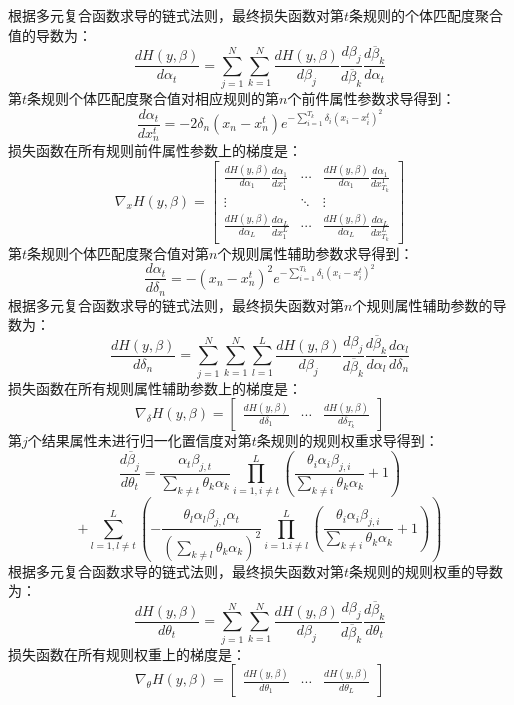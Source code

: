 \documentclass{cjc}
\begin{document}
根据多元复合函数求导的链式法则，最终损失函数对第$t$条规则的个体匹配度聚合值的导数为：
$$\frac{dH(y,\beta)}{d\alpha_t}=\sum_{j=1}^N\sum_{k=1}^N\frac{dH(y,\beta)}{d\beta_j}\frac{d\beta_j}{d\overline{\beta}_k}\frac{d\overline{\beta}_k}{d\alpha_t}$$
第$t$条规则个体匹配度聚合值对相应规则的第$n$个前件属性参数求导得到：
$$\frac{d\alpha_t}{dx_n^t}=-2\delta_n(x_n-x_n^t)e^{-\sum_{i=1}^{T_k}\delta_i(x_i-x_i^t)^2}$$
损失函数在所有规则前件属性参数上的梯度是：
$$\nabla_{x}H(y,\beta)=\left[
\begin{matrix}
\frac{dH(y,\beta)}{d\alpha_1}\frac{d\alpha_1}{dx_1^1} & \cdots &
\frac{dH(y,\beta)}{d\alpha_1}\frac{d\alpha_1}{dx_{T_k}^1}\\
\vdots & \ddots & \vdots \\
\frac{dH(y,\beta)}{d\alpha_L}\frac{d\alpha_L}{dx_1^L}  & \cdots &
\frac{dH(y,\beta)}{d\alpha_L}\frac{d\alpha_L}{dx_{T_k}^L} 
\end{matrix}
\right]$$
第$t$条规则个体匹配度聚合值对第$n$个规则属性辅助参数求导得到：
$$\frac{d\alpha_t}{d\delta_n}=-(x_n-x_n^t)^{2}e^{-\sum_{i=1}^{T_k}\delta_i(x_i-x_i^t)^2}$$
根据多元复合函数求导的链式法则，最终损失函数对第$n$个规则属性辅助参数的导数为：
$$\frac{dH(y,\beta)}{d\delta_n}=\sum_{j=1}^N\sum_{k=1}^N\sum_{l=1}^L\frac{dH(y,\beta)}{d\beta_j}\frac{d\beta_j}{d\overline{\beta}_k}\frac{d\overline{\beta}_k}{d\alpha_l}\frac{d\alpha_l}{d\delta_n}$$
损失函数在所有规则属性辅助参数上的梯度是：
$$
\nabla_{\delta}H(y,\beta)=\left[
\begin{matrix}
\frac{dH(y,\beta)}{d\delta_1} & \cdots &
\frac{dH(y,\beta)}{d\delta_{T_k}}
\end{matrix}
\right]
$$
第$j$个结果属性未进行归一化置信度对第$t$条规则的规则权重求导得到：
$$\frac{d\overline{\beta}_j}{d\theta_t}=\frac{\alpha_t\beta_{j,t}}{\sum_{k\neq t}\theta_k\alpha_k}\prod_{i=1,i\neq t}^L(\frac{\theta_i\alpha_i\beta_{j,i}}{\sum_{k\neq i}{\theta_k\alpha_k}}+1)$$
$$+\sum_{l=1,l\neq t}^L(-\frac{\theta_l\alpha_l\beta_{j,l}\alpha_t}{(\sum_{k\neq l}\theta_k\alpha_k)^2}\prod_{i=1.i\neq l}^L(\frac{\theta_i\alpha_i\beta_{j,i}}{\sum_{k\neq i}{\theta_k\alpha_k}}+1))$$
根据多元复合函数求导的链式法则，最终损失函数对第$t$条规则的规则权重的导数为：
$$\frac{dH(y,\beta)}{d\theta_t}=\sum_{j=1}^N\sum_{k=1}^N\frac{dH(y,\beta)}{d\beta_j}\frac{d\beta_j}{d\overline{\beta}_k}\frac{d\overline{\beta}_k}{d\theta_t}$$
损失函数在所有规则权重上的梯度是：
$$
\nabla_{\theta}H(y,\beta)=\left[
\begin{matrix}
\frac{dH(y,\beta)}{d\theta_1} & \cdots &
\frac{dH(y,\beta)}{d\theta_L}
\end{matrix}
\right]
$$
\end{document}
